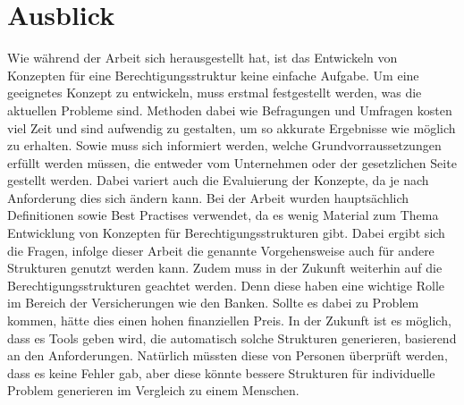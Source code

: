 \section{Ausblick}
\label{sec:chapter06:Ausblick}
Wie während der Arbeit sich herausgestellt hat, ist das Entwickeln von Konzepten für eine Berechtigungsstruktur keine einfache Aufgabe.
Um eine geeignetes Konzept zu entwickeln, muss erstmal festgestellt werden, was die aktuellen Probleme sind.
Methoden dabei wie Befragungen und Umfragen kosten viel Zeit und sind aufwendig zu gestalten, um so akkurate Ergebnisse wie möglich zu erhalten.
Sowie muss sich informiert werden, welche Grundvorraussetzungen erfüllt werden müssen, die entweder vom Unternehmen oder der gesetzlichen Seite gestellt werden.
Dabei variert auch die Evaluierung der Konzepte, da je nach Anforderung dies sich ändern kann.
\newline
Bei der Arbeit wurden hauptsächlich Definitionen sowie Best Practises verwendet, da es wenig Material zum Thema Entwicklung von Konzepten für Berechtigungsstrukturen gibt.
Dabei ergibt sich die Fragen, infolge dieser Arbeit die genannte Vorgehensweise auch für andere Strukturen genutzt werden kann.
\newline
Zudem muss in der Zukunft weiterhin auf die Berechtigungsstrukturen geachtet werden.
Denn diese haben eine wichtige Rolle im Bereich der Versicherungen wie den Banken.
Sollte es dabei zu Problem kommen, hätte dies einen hohen finanziellen Preis.
In der Zukunft ist es möglich, dass es Tools geben wird, die automatisch solche Strukturen generieren, basierend an den Anforderungen.
Natürlich müssten diese von Personen überprüft werden, dass es keine Fehler gab, aber diese könnte bessere Strukturen für individuelle Problem generieren im Vergleich zu einem Menschen.